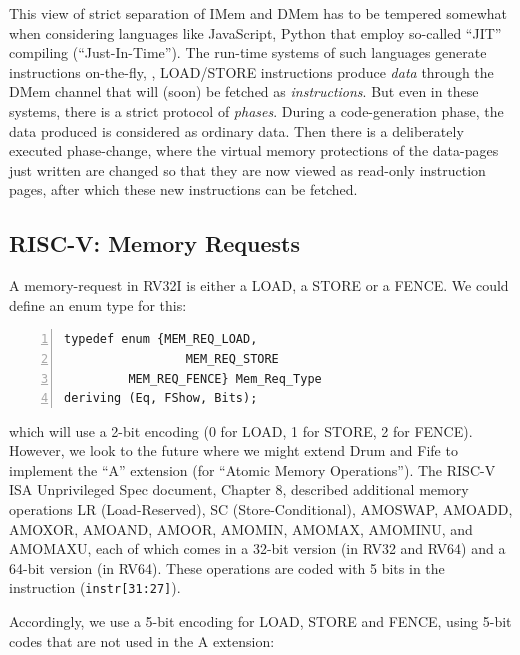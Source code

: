 
This view of strict separation of IMem and DMem has to be tempered
somewhat when considering languages like JavaScript, Python {\etc}
that employ so-called ``JIT'' compiling (``Just-In-Time'').  The
run-time systems of such languages generate instructions on-the-fly,
{\ie}, LOAD/STORE instructions produce \emph{data} through the DMem
channel that will (soon) be fetched as \emph{instructions}.  But even
in these systems, there is a strict protocol of \emph{phases}.  During
a code-generation phase, the data produced is considered as ordinary
data.  Then there is a deliberately executed phase-change, where the
virtual memory protections of the data-pages just written are changed
so that they are now viewed as read-only instruction pages, after
which these new instructions can be fetched.


\subsection{RISC-V: Memory Requests}

\label{Sec_Mem_Req}


A memory-request in RV32I is either a LOAD, a STORE or a FENCE.  We
could define an enum type for this:

{\small
\begin{Verbatim}[frame=single, numbers=left]
   typedef enum {MEM_REQ_LOAD,
                 MEM_REQ_STORE
		 MEM_REQ_FENCE} Mem_Req_Type
deriving (Eq, FShow, Bits);
\end{Verbatim}
}

which will use a 2-bit encoding (0 for LOAD, 1 for STORE, 2 for
FENCE).  However, we look to the future where we might extend Drum and
Fife to implement the ``A'' extension (for ``Atomic Memory
Operations'').  The RISC-V ISA Unprivileged Spec document, Chapter 8,
described additional memory operations LR (Load-Reserved), SC
(Store-Conditional), AMOSWAP, AMOADD, AMOXOR, AMOAND, AMOOR, AMOMIN,
AMOMAX, AMOMINU, and AMOMAXU, each of which comes in a 32-bit version
(in RV32 and RV64) and a 64-bit version (in RV64).  These operations
are coded with 5 bits in the instruction (\verb|instr[31:27]|).

Accordingly, we use a 5-bit encoding for LOAD, STORE and FENCE, using
5-bit codes that are not used in the A extension:

